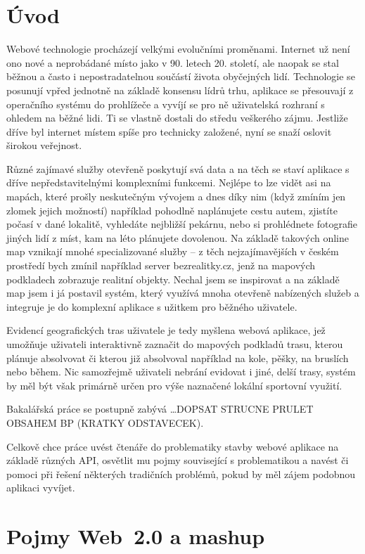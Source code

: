 \chapter*{Úvod}

Webové technologie procházejí velkými evolučními proměnami. Internet
už není ono nové a neprobádané místo jako v 90. letech 20.
století, ale naopak se stal běžnou a často i nepostradatelnou
součástí života obyčejných lidí. Technologie se posunují vpřed
jednotně na základě konsensu lídrů trhu, aplikace se přesouvají z
operačního systému do prohlížeče a vyvíjí se pro ně uživatelská
rozhraní s ohledem na běžné lidi. Ti se vlastně dostali do středu
veškerého zájmu. Jestliže dříve byl internet místem spíše pro
technicky založené, nyní se snaží oslovit širokou veřejnost.

Různé zajímavé služby otevřeně poskytují svá data a na těch se staví
aplikace s dříve nepředstavitelnými komplexními funkcemi. Nejlépe to lze vidět
asi na mapách, které prošly neskutečným vývojem a dnes díky nim (když
zmíním jen zlomek jejich možností) například pohodlně naplánujete
cestu autem, zjistíte počasí v dané lokalitě, vyhledáte nejbližší
pekárnu, nebo si prohlédnete fotografie jiných lidí z míst, kam na
léto plánujete dovolenou. Na základě takových online map vznikají
mnohé specializované služby -- z těch nejzajímavějších v českém
prostředí bych zmínil například server bezrealitky.cz, jenž na
mapových podkladech zobrazuje realitní objekty. Nechal jsem se
inspirovat a na základě map jsem i já postavil systém, který využívá
mnoha otevřeně nabízených služeb a integruje je do komplexní aplikace
s užitkem pro běžného uživatele.

Evidencí geografických tras uživatele je tedy myšlena webová aplikace,
jež umožňuje uživateli interaktivně zaznačit do mapových podkladů trasu,
kterou plánuje absolvovat či kterou již absolvoval například na kole,
pěšky, na bruslích nebo během. Nic samozřejmě uživateli nebrání
evidovat i jiné, delší trasy, systém by měl být však primárně určen
pro výše naznačené lokální sportovní využití.

Bakalářská práce se postupně zabývá \ldots DOPSAT STRUCNE PRULET
OBSAHEM BP (KRATKY ODSTAVECEK).

Celkově chce práce uvést čtenáře do problematiky stavby webové
aplikace na základě různých API, osvětlit mu pojmy související s
problematikou a navést či pomoci při řešení některých tradičních
problémů, pokud by měl zájem podobnou aplikaci vyvíjet.

\chapter{Pojmy Web~2.0 a mashup}\label{mashup}


